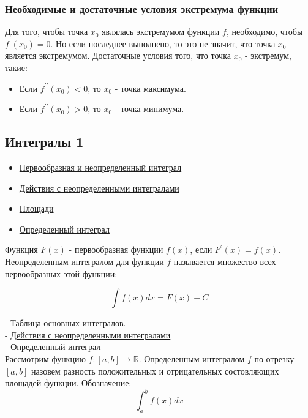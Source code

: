 \documentclass{article}
\begin{document}
\subsubsection{Необходимые и достаточные условия экстремума функции}

Для того, чтобы точка $x_0$ являлась экстремумом функции $f$, необходимо, чтобы $f^{\prime}(x_0) = 0$. Но если последнее выполнено, то это не значит, что точка $x_0$ является экстремумом. Достаточные условия того, что точка $x_0$ - экстремум, такие:

\begin{itemize}
	\item Если $f^{\prime \prime}(x_0) < 0$, то $x_0$ - точка максимума.
	\item Если $f^{\prime \prime}(x_0) > 0$, то $x_0$ - точка минимума.
\end{itemize}

\subsection{Интегралы 1}

\begin{itemize}
	\item \href{https://stepik.org/lesson/28376/step/1}{Первообразная и неопределенный интеграл}
	\item \href{https://stepik.org/lesson/28377/step/1}{Действия с неопределенными интегралами}
	\item \href{https://stepik.org/lesson/28378/step/2}{Площади}
	\item \href{https://stepik.org/lesson/28379/step/1}{Определенный интеграл}
\end{itemize}

Функция $F(x)$ - первообразная функции $f(x)$, если $F^{\prime}(x) = f(x)$. \\

Неопределенным интегралом для функции $f$ называется множество всех первообразных этой функции:

$$ \int f(x) dx = F(x) + C $$

- \href{https://stepik.org/lesson/28376/step/3}{Таблица основных интегралов}. \\
- \href{https://stepik.org/lesson/28377/step/2}{Действия с неопределенными интегралами} \\
- \href{https://stepik.org/lesson/28379/step/2}{Определенный интеграл} \\

Рассмотрим функцию $f : [a, b] \to \mathbb{R}$. Определенным интегралом $f$ по отрезку $[a, b]$ назовем разность положительных и отрицательных состовляющих площадей функции. Обозначение: $$ \int_{a}^{b} f(x) dx $$
\end{document}
